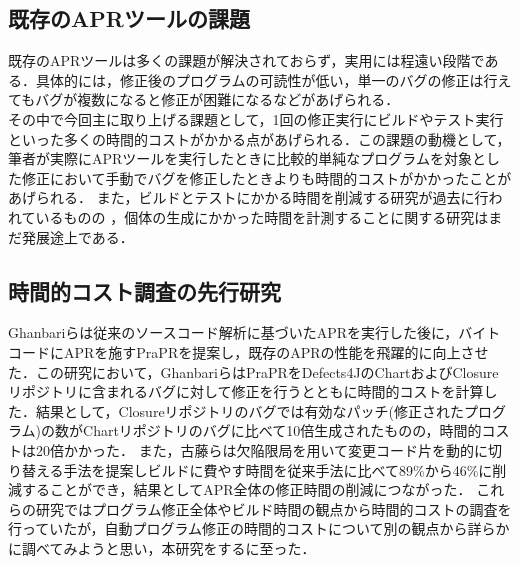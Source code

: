 \documentclass[uplatex,dvipdfmx,a4paper]{jsarticle}
\let\oldcite\cite
\renewcommand{\cite}[1]{\xspace\oldcite{#1}}
\begin{document}
\subsection{既存のAPRツールの課題} \label{sec:prev_challenge}
既存のAPRツールは多くの課題が解決されておらず\cite{le2013current}，実用には程遠い段階である．具体的には，修正後のプログラムの可読性が低い\cite{smith2015cure}，単一のバグの修正は行えてもバグが複数になると修正が困難になる\cite{saha2019harnessing}などがあげられる．\\
その中で今回主に取り上げる課題として，1回の修正実行にビルドやテスト実行といった多くの時間的コストがかかる点\cite{chen2017contract}があげられる．この課題の動機として，筆者が実際にAPRツールを実行したときに比較的単純なプログラムを対象とした修正において手動でバグを修正したときよりも時間的コストがかかったことがあげられる．
また，ビルドとテストにかかる時間を削減する研究が過去に行われているものの\cite{id692}
，個体の生成にかかった時間を計測することに関する研究はまだ発展途上である．
\subsection{時間的コスト調査の先行研究}
Ghanbari\cite{ghanbari2019practical}らは従来のソースコード解析に基づいたAPRを実行した後に，バイトコードにAPRを施すPraPRを提案し，既存のAPRの性能を飛躍的に向上させた．この研究において，GhanbariらはPraPRをDefects4JのChartおよびClosureリポジトリに含まれるバグに対して修正を行うとともに時間的コストを計算した．結果として，Closureリポジトリのバグでは有効なパッチ(修正されたプログラム)の数がChartリポジトリのバグに比べて10倍生成されたものの，時間的コストは20倍かかった．
また，古藤\cite{id692}らは欠陥限局を用いて変更コード片を動的に切り替える手法を提案しビルドに費やす時間を従来手法に比べて89\%から46\%に削減することができ，結果としてAPR全体の修正時間の削減につながった．
これらの研究ではプログラム修正全体やビルド時間の観点から時間的コストの調査を行っていたが，自動プログラム修正の時間的コストについて別の観点から詳らかに調べてみようと思い，本研究をするに至った．
\clearpage
\end{document}
